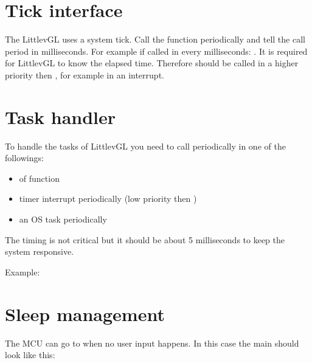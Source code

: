 \documentclass[letterpaper,10pt,english]{sphinxmanual}
\begin{document}
\section{Tick interface}
\label{\detokenize{porting/tick::doc}}\label{\detokenize{porting/tick:tick-interface}}
The LittlevGL uses a system tick. Call the  function periodically and tell the call period in milliseconds. For example if called in every milliseconds: .
It is required for LittlevGL to know the elapsed time. Therefore  should be called in a higher priority then , for example in an interrupt.


\section{Task handler}
\label{\detokenize{porting/task-handler::doc}}\label{\detokenize{porting/task-handler:task-handler}}
To handle the tasks of LittlevGL you need to call  periodically in one of the followings:
\begin{itemize}
\item {} 
 of  function

\item {} 
timer interrupt periodically (low priority then )

\item {} 
an OS task periodically

\end{itemize}

The timing is not critical but it should be about 5 milliseconds to keep the system responsive.

Example:

%
\begin{sphinxVerbatim}[commandchars=\\\{\}]
 
\end{sphinxVerbatim}


\section{Sleep management}
\label{\detokenize{porting/sleep::doc}}\label{\detokenize{porting/sleep:sleep-management}}
The MCU can go to  when no user input happens. In this case the main  should look like this:
\end{document}
